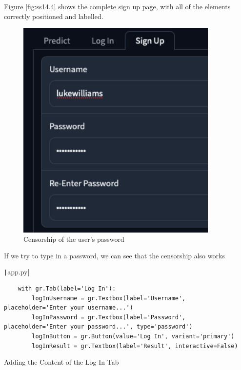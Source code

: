 \documentclass[12pt]{report}
\newcommand{\pil}[1]{\protect\texttt|#1|}
\begin{document}
Figure \ref{fig:ss14.4} shows the complete sign up page, with all of the elements correctly positioned and labelled.

\begin{figure}[H]
\centering
\includegraphics[width=10cm]{ss14.5.png}
\caption{Censorship of the user's password}\label{fig:ss14.5}
\end{figure}

If we try to type in a password, we can see that the censorship also works

\begin{center}
\end{center}

\begin{listing}[H]
\pil{app.py}
\begin{verbatim}
    with gr.Tab(label='Log In'):
        logInUsername = gr.Textbox(label='Username', placeholder='Enter your username...')
        logInPassword = gr.Textbox(label='Password', placeholder='Enter your password...', type='password')
        logInButton = gr.Button(value='Log In', variant='primary')
        logInResult = gr.Textbox(label='Result', interactive=False)
\end{verbatim}
\caption{Adding the Content of the Log In Tab}\label{cs:logInContent}
\end{listing}
\end{document}
